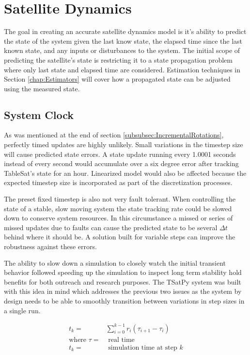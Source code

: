\section{Satellite Dynamics}
\label{sec:SatelliteDynamics}

The goal in creating an accurate satellite dynamics model is it's ability to predict the state of the system given the last know state, the elapsed time since the last known state, and any inputs or disturbances to the system.  The initial scope of predicting the satellite's state is restricting it to a state propagation problem where only last state and elapsed time are considered.  Estimation techniques in Section \ref{chap:Estimators} will cover how a propagated state can be adjusted using the measured state.

\subsection{System Clock}
\label{subsec:SystemClock}

As was mentioned at the end of section \ref{subsubsec:IncrementalRotations}, perfectly timed updates are highly unlikely.  Small variations in the timestep size will cause predicted state errors.  A state update running every 1.0001 seconds instead of every second would accumulate over a six degree error after tracking TableSat's state for an hour.  Linearized model would also be affected because the expected timestep size is incorporated as part of the discretization processes.

The preset fixed timestep is also not very fault tolerant.  When controlling the state of a stable, slow moving system the state tracking rate could be slowed down to conserve system resources.  In this circumstance a missed or series of missed updates due to faults can cause the predicted state to be several $\Delta t$ behind where it should be.  A solution built for variable steps can improve the robustness against these errors.

The ability to slow down a simulation to closely watch the initial transient behavior followed speeding up the simulation to inspect long term stability hold benefits for both outreach and research purposes.  The TSatPy system was built with this idea in mind which addresses the previous two issues as the system by design needs to be able to smoothly transition between variations in step sizes in a single run.


\begin{equation}
  \begin{aligned}
    t_k =& \sum\limits_{i=0}^{k-1} r_i (\tau_{i+1} - \tau_i)\\
    \text{where } \tau =& \text{ real time} \\
    t_k =& \text{ simulation time at step }k
  \end{aligned}
  \label{eqn:SystemTime}
\end{equation}

